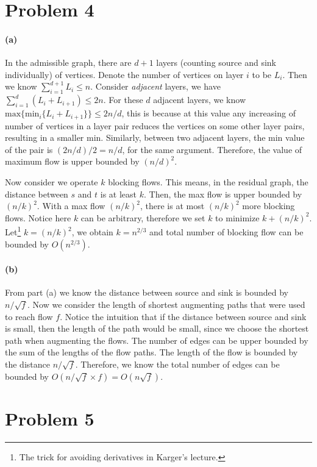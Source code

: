 \documentclass[12pt]{article}
\begin{document}
\section*{Problem 4} 
\paragraph{(a)} In the admissible graph, there are $d + 1$ layers (counting source and sink individually) of vertices. Denote the number of vertices on layer $i$ to be $L_i$. Then we know $\sum_{i=1}^{d+1} L_i \leq n$. Consider \emph{adjacent} layers, we have $\sum_{i=1}^{d} (L_i + L_{i+1}) \leq 2n$. For these $d$ adjacent layers, we know $\text{max}\big\{\text{min}_i\{L_i + L_{i+1}\}\big\} \leq 2n/d$, this is because at this value any increasing of number of vertices in a layer pair reduces the vertices on some other layer pairs, resulting in a smaller min. Similarly, between two adjacent layers, the min value of the pair is $(2n/d)/2 = n/d$, for the same argument. Therefore, the value of maximum flow is upper bounded by $\left(n/d\right)^2$.

Now consider we operate $k$ blocking flows. This means, in the residual graph, the distance between $s$ and $t$ is at least $k$. Then, the max flow is upper bounded by $(n/k)^2$. With a max flow $(n/k)^2$, there is at most $(n/k)^2$ more blocking flows. Notice here $k$ can be arbitrary, therefore we set $k$ to minimize $k+(n/k)^2$. Let\footnote{The trick for avoiding derivatives in Karger's lecture.} $k=(n/k)^2$, we obtain $k=n^{2/3}$ and total number of blocking flow can be bounded by $O(n^{2/3})$. 
\paragraph{(b)} From part (a) we know the distance between source and sink is bounded by $n / \sqrt{f}$. Now we consider the length of shortest augmenting paths that were used to reach flow $f$. Notice the intuition that if the distance between source and sink is small, then the length of the path would be small, since we choose the shortest path when augmenting the flows. The number of edges can be upper bounded by the sum of the lengths of the flow paths. The length of the flow is bounded by the distance $n / \sqrt{f}$. Therefore, we know the total number of edges can be bounded by $O(n/\sqrt{f} \times f) = O(n \sqrt{f})$.
\pagebreak

\section*{Problem 5}
\end{document}
